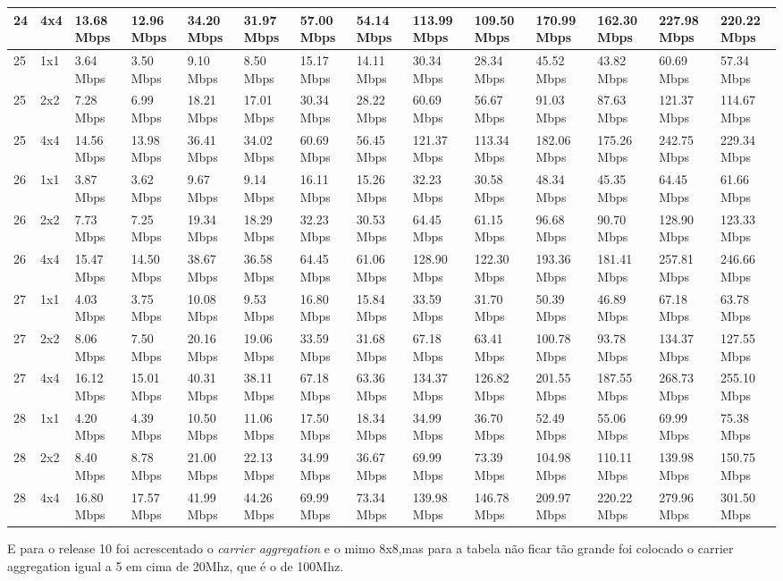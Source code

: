 \documentclass[12pt]{article}
\begin{document}
\begin{longtable}[c]{|l|l|l|l|l|l|l|l|l|l|l|l|l|l|}
24 & 4x4 & 13.68 Mbps & 12.96 Mbps & 34.20 Mbps & 31.97 Mbps & 57.00 Mbps & 54.14 Mbps & 113.99 Mbps & 109.50 Mbps & 170.99 Mbps & 162.30 Mbps & 227.98 Mbps & 220.22 Mbps \\ \hline
25 & 1x1 & 3.64 Mbps & 3.50 Mbps & 9.10 Mbps & 8.50 Mbps & 15.17 Mbps & 14.11 Mbps & 30.34 Mbps & 28.34 Mbps & 45.52 Mbps & 43.82 Mbps & 60.69 Mbps & 57.34 Mbps \\ \hline
25 & 2x2 & 7.28 Mbps & 6.99 Mbps & 18.21 Mbps & 17.01 Mbps & 30.34 Mbps & 28.22 Mbps & 60.69 Mbps & 56.67 Mbps & 91.03 Mbps & 87.63 Mbps & 121.37 Mbps & 114.67 Mbps \\ \hline
25 & 4x4 & 14.56 Mbps & 13.98 Mbps & 36.41 Mbps & 34.02 Mbps & 60.69 Mbps & 56.45 Mbps & 121.37 Mbps & 113.34 Mbps & 182.06 Mbps & 175.26 Mbps & 242.75 Mbps & 229.34 Mbps \\ \hline
26 & 1x1 & 3.87 Mbps & 3.62 Mbps & 9.67 Mbps & 9.14 Mbps & 16.11 Mbps & 15.26 Mbps & 32.23 Mbps & 30.58 Mbps & 48.34 Mbps & 45.35 Mbps & 64.45 Mbps & 61.66 Mbps \\ \hline
26 & 2x2 & 7.73 Mbps & 7.25 Mbps & 19.34 Mbps & 18.29 Mbps & 32.23 Mbps & 30.53 Mbps & 64.45 Mbps & 61.15 Mbps & 96.68 Mbps & 90.70 Mbps & 128.90 Mbps & 123.33 Mbps \\ \hline
26 & 4x4 & 15.47 Mbps & 14.50 Mbps & 38.67 Mbps & 36.58 Mbps & 64.45 Mbps & 61.06 Mbps & 128.90 Mbps & 122.30 Mbps & 193.36 Mbps & 181.41 Mbps & 257.81 Mbps & 246.66 Mbps \\ \hline
27 & 1x1 & 4.03 Mbps & 3.75 Mbps & 10.08 Mbps & 9.53 Mbps & 16.80 Mbps & 15.84 Mbps & 33.59 Mbps & 31.70 Mbps & 50.39 Mbps & 46.89 Mbps & 67.18 Mbps & 63.78 Mbps \\ \hline
27 & 2x2 & 8.06 Mbps & 7.50 Mbps & 20.16 Mbps & 19.06 Mbps & 33.59 Mbps & 31.68 Mbps & 67.18 Mbps & 63.41 Mbps & 100.78 Mbps & 93.78 Mbps & 134.37 Mbps & 127.55 Mbps \\ \hline
27 & 4x4 & 16.12 Mbps & 15.01 Mbps & 40.31 Mbps & 38.11 Mbps & 67.18 Mbps & 63.36 Mbps & 134.37 Mbps & 126.82 Mbps & 201.55 Mbps & 187.55 Mbps & 268.73 Mbps & 255.10 Mbps \\ \hline
28 & 1x1 & 4.20 Mbps & 4.39 Mbps & 10.50 Mbps & 11.06 Mbps & 17.50 Mbps & 18.34 Mbps & 34.99 Mbps & 36.70 Mbps & 52.49 Mbps & 55.06 Mbps & 69.99 Mbps & 75.38 Mbps \\ \hline
28 & 2x2 & 8.40 Mbps & 8.78 Mbps & 21.00 Mbps & 22.13 Mbps & 34.99 Mbps & 36.67 Mbps & 69.99 Mbps & 73.39 Mbps & 104.98 Mbps & 110.11 Mbps & 139.98 Mbps & 150.75 Mbps \\ \hline
28 & 4x4 & 16.80 Mbps & 17.57 Mbps & 41.99 Mbps & 44.26 Mbps & 69.99 Mbps & 73.34 Mbps & 139.98 Mbps & 146.78 Mbps & 209.97 Mbps & 220.22 Mbps & 279.96 Mbps & 301.50 Mbps \\ \hline
\end{longtable}
\normalsize
E para o release 10 foi acrescentado o \textit{carrier aggregation} \cite{CarrierAgg} e o mimo 8x8,mas para a tabela não ficar tão grande foi colocado o carrier aggregation igual a 5 em cima de 20Mhz, que é o de 100Mhz.
\end{document}
